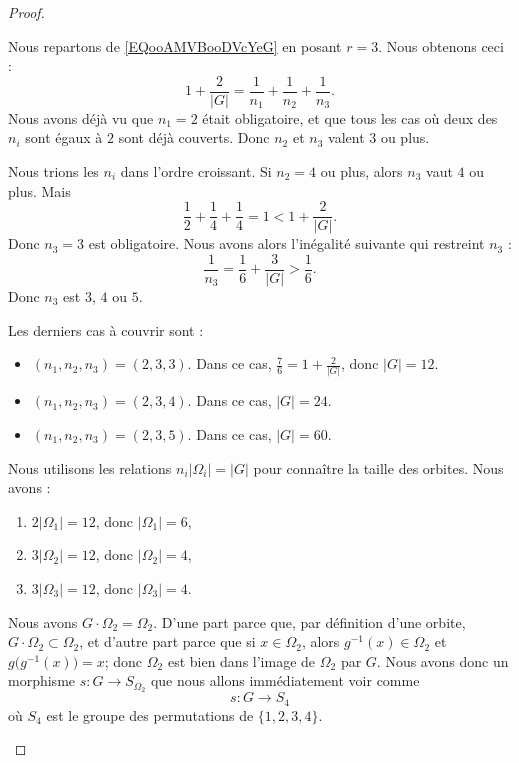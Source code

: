 \begin{proof}
\begin{subproof}
		\spitem[Si \( r=3\), les autres cas possibles]
		Nous repartons de \eqref{EQooAMVBooDVcYeG} en posant \( r=3\). Nous obtenons ceci :
		\begin{equation}
			1+\frac{ 2 }{ | G | }=\frac{1}{ n_1 }+\frac{1}{ n_2 }+\frac{1}{ n_3 }.
		\end{equation}
		Nous avons déjà vu que \( n_1=2\) était obligatoire, et que tous les cas où deux des \( n_i\) sont égaux à \( 2\) sont déjà couverts. Donc \( n_2\) et \( n_3\) valent \( 3\) ou plus.

		Nous trions les \( n_i\) dans l'ordre croissant. Si \( n_2=4\) ou plus, alors \( n_3\) vaut \( 4\) ou plus. Mais
		\begin{equation}
			\frac{ 1 }{2}+\frac{1}{ 4 }+\frac{1}{ 4 }=1<1+\frac{ 2 }{ | G | }.
		\end{equation}
		Donc \( n_3=3\) est obligatoire. Nous avons alors l'inégalité suivante qui restreint \( n_3\) :
		\begin{equation}
			\frac{1}{ n_3 }=\frac{1}{ 6 }+\frac{ 3 }{ | G | }>\frac{1}{ 6 }.
		\end{equation}
		Donc \( n_3\) est \( 3\), \( 4\) ou \( 5\).

		Les derniers cas à couvrir sont :
		\begin{itemize}
			\item \( (n_1,n_2,n_3)=(2,3,3)\). Dans ce cas, \( \frac{ 7 }{ 6 }=1+\frac{ 2 }{ | G | }\), donc \( | G |=12\).
			\item \( (n_1,n_2,n_3)=(2,3,4)\). Dans ce cas, \( | G |=24\).
			\item \( (n_1,n_2,n_3)=(2,3,5)\). Dans ce cas, \( | G |=60\).
		\end{itemize}

		\spitem[Le cas \( (2,3,3)\)]

		Nous utilisons les relations \( n_i| \Omega_i |=| G |\) pour connaître la taille des orbites. Nous avons :
		\begin{enumerate}
			\item
			      \( 2| \Omega_1 |=12\), donc \( | \Omega_1 |=6\),
              \item
			      \( 3| \Omega_2 |=12\), donc \( | \Omega_2 |=4\),
              \item
			      \( 3| \Omega_3 |=12\), donc \( | \Omega_3 |=4\).
		\end{enumerate}

		Nous avons \( G\cdot \Omega_2=\Omega_2\). D'une part parce que, par définition d'une orbite, \( G\cdot\Omega_2\subset\Omega_2\), et d'autre part parce que si \( x\in\Omega_2\), alors \( g^{-1}(x)\in\Omega_2\) et \( g\big( g^{-1}(x) \big)=x\); donc \( \Omega_2\) est bien dans l'image de \( \Omega_2\) par \( G\). Nous avons donc un morphisme \( s\colon G\to S_{\Omega_2}\) que nous allons immédiatement voir comme
		\begin{equation}
			s\colon G\to S_4
		\end{equation}
		où \( S_4\) est le groupe des permutations de \( \{ 1,2,3,4 \}\).


\end{subproof}
\end{proof}
